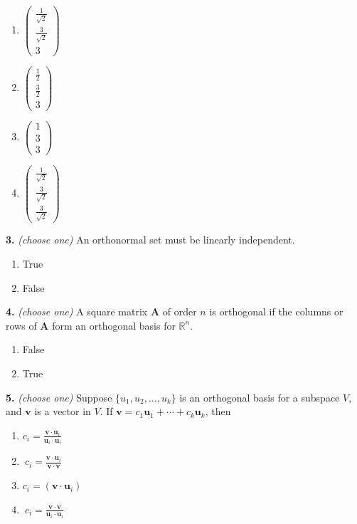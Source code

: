 \documentclass[10pt,a4paper]{article}
\begin{document}
\begin{enumerate}[label=(\Alph*)]
\item \(\begin{pmatrix}\frac{1}{\sqrt{2}}\\\frac{3}{\sqrt{2}}\\3\end{pmatrix}\)
\item \(\begin{pmatrix}\frac{1}{2}\\\frac{3}{2}\\3\end{pmatrix}\)
\item \(\begin{pmatrix}1\\3\\3\end{pmatrix}\)
\item \(\begin{pmatrix}\frac{1}{\sqrt{2}}\\\frac{3}{\sqrt{2}}\\\frac{3}{\sqrt{2}}\end{pmatrix}\)
\end{enumerate}
\smallskip
\textbf{3.} \textit{(choose one)} An orthonormal set must be linearly independent.

\begin{enumerate}[label=(\Alph*)]
\item True
\item False
\end{enumerate}
\smallskip
\textbf{4.} \textit{(choose one)} A square matrix \(\mathbf{A}\) of order \(n\) is orthogonal if the columns or rows of \(\mathbf{A}\) form an orthogonal basis for \(\mathbb{R}^n\).

\begin{enumerate}[label=(\Alph*)]
\item False
\item True
\end{enumerate}
\smallskip
\textbf{5.} \textit{(choose one)} Suppose \(\{u_1,u_2,...,u_k\}\) is an orthogonal basis for a subspace \(V\), and \(\mathbf v\) is a vector in \(V\). If \(\mathbf{v}=c_1\mathbf{u}_1+\cdots+c_k\mathbf{u}_k\), then

\begin{enumerate}[label=(\Alph*)]
\item \( c_i=\frac{\mathbf v\cdot \mathbf u_i}{\mathbf u_i\cdot \mathbf u_i}\)
\item \(\ c_i=\frac{\mathbf v\cdot \mathbf u_i}{\mathbf v\cdot \mathbf v}\)
\item \( c_i=(\mathbf v\cdot \mathbf u_i)\)
\item \(\ c_i=\frac{\mathbf v\cdot \mathbf v}{\mathbf u_i\cdot \mathbf u_i}\)
\end{enumerate}
\smallskip
\end{document}
